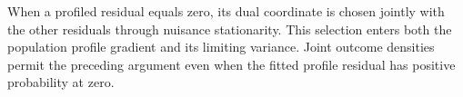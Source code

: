 When a profiled residual equals zero, its dual coordinate is chosen
jointly with the other residuals through nuisance stationarity. This
selection enters both the population profile gradient and its limiting
variance. Joint outcome densities permit the preceding argument even
when the fitted profile residual has positive probability at zero.

